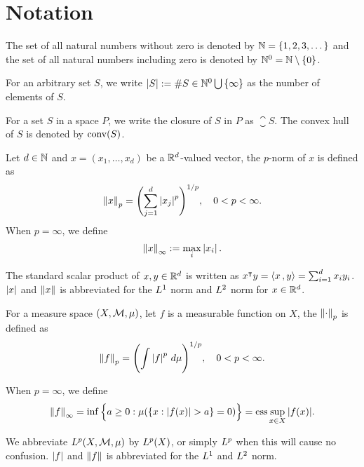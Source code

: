 \chapter*{Notation}
\label{c:Notation}


The set of all natural numbers without zero is denoted by $\mathbb{N} =
\{1,2,3,\dots\}$ and the set of all natural numbers including zero is denoted by
$\mathbb{N}^0 = \mathbb{N} \setminus \{0\}$. 

For an arbitrary set $S$, we write $\left| S \right| := \# S \in \mathbb{N}^0 \bigcup\,
\{\infty\}$ as the number of elements of $S$.

For a set $S$ in a space $P$, we write the closure of $S$ in $P$ as
$\closure{S}$. The convex hull of $S$ is denoted by $\operatorname*{conv}(S)$.

Let $d \in \mathbb{N}$ and $x = (x_1, \dots, x_d)$ be a $\mathbb{R}^d$-valued vector, the
$p$-norm of $x$ is defined as
\begin{equation*}
    \left\| x \right\|_p = \Biggl( \sum_{j=1}^d \left| x_j \right|^p \Biggr)^{1/p}, \quad
    0 < p < \infty.
\end{equation*}
When $p = \infty$, we define 
\begin{equation*}
    \left\| x \right\|_{\infty} := \max_i \left| x_i \right|.
\end{equation*}

The standard scalar product of $x,y\in\mathbb{R}^d$ is written as $x{}^{\intercal} y = \left\langle x\, , y \right\rangle =
\sum_{i=1}^d x_iy_i$. $\left| x \right|$ and $\left\| x \right\|$ is abbreviated for the $L^{1}$
norm and $L^{2}$ norm for $x \in \mathbb{R}^d$.

For a measure space $(X, \mathcal{M}, \mu)$, let $f$ is a measurable function on
$X$, the $\left\| \cdot \right\|_{p}$ is defined as
\begin{equation*}
    \left\| f \right\|_p = \Biggl( \int \left| f \right|^p \, d\mu \Biggr)^{1/p}, \quad
    0 < p < \infty.
\end{equation*}

When $p = \infty$, we define 
\begin{equation*}
    \left\| f \right\|_{\infty} = \inf\Big\{
        a \geq 0:
        \mu(\{x: \left| f(x) \right| > a \} = 0)
    \Big\} = \operatorname*{ess}{\sup_{x\in X} \left| f(x) \right|}.
\end{equation*}

We abbreviate $L^{p}(X, \mathcal{M}, \mu)$ by $L^{p}(X)$, or simply $L^{p}$ when
this will cause no confusion. $\left| f \right|$ and $\left\| f \right\|$ is abbreviated for the
$L^{1}$ and $L^{2}$ norm.

